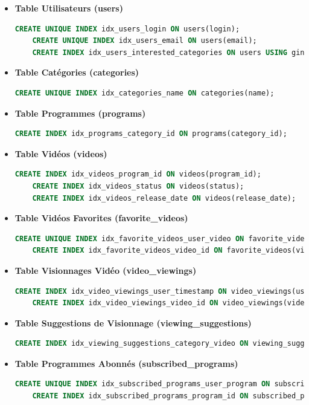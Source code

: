 \documentclass{article}
\begin{document}
\begin{itemize}
    \item \textbf{Table Utilisateurs (users)}
    \begin{lstlisting}[language=SQL]
    CREATE UNIQUE INDEX idx_users_login ON users(login);
    CREATE UNIQUE INDEX idx_users_email ON users(email);
    CREATE INDEX idx_users_interested_categories ON users USING gin(interested_categories);
    \end{lstlisting}
    \item \textbf{Table Catégories (categories)}
    \begin{lstlisting}[language=SQL]
    CREATE UNIQUE INDEX idx_categories_name ON categories(name);
    \end{lstlisting}
    \item \textbf{Table Programmes (programs)}
    \begin{lstlisting}[language=SQL]
    CREATE INDEX idx_programs_category_id ON programs(category_id);
    \end{lstlisting}
    \item \textbf{Table Vidéos (videos)}
    \begin{lstlisting}[language=SQL]
    CREATE INDEX idx_videos_program_id ON videos(program_id);
    CREATE INDEX idx_videos_status ON videos(status);
    CREATE INDEX idx_videos_release_date ON videos(release_date);
    \end{lstlisting}
    \item \textbf{Table Vidéos Favorites (favorite_videos)}
    \begin{lstlisting}[language=SQL]
    CREATE UNIQUE INDEX idx_favorite_videos_user_video ON favorite_videos(user_id, video_id);
    CREATE INDEX idx_favorite_videos_video_id ON favorite_videos(video_id);
    \end{lstlisting}
    \item \textbf{Table Visionnages Vidéo (video_viewings)}
    \begin{lstlisting}[language=SQL]
    CREATE INDEX idx_video_viewings_user_timestamp ON video_viewings(user_id, viewing_timestamp);
    CREATE INDEX idx_video_viewings_video_id ON video_viewings(video_id);
    \end{lstlisting}
    \item \textbf{Table Suggestions de Visionnage (viewing_suggestions)}
    \begin{lstlisting}[language=SQL]
    CREATE INDEX idx_viewing_suggestions_category_video ON viewing_suggestions(category_id, video_id);
    \end{lstlisting}
    \item \textbf{Table Programmes Abonnés (subscribed_programs)}
    \begin{lstlisting}[language=SQL]
    CREATE UNIQUE INDEX idx_subscribed_programs_user_program ON subscribed_programs(user_id, program_id);
    CREATE INDEX idx_subscribed_programs_program_id ON subscribed_programs(program_id);
    \end{lstlisting}
\end{itemize}
\end{document}
